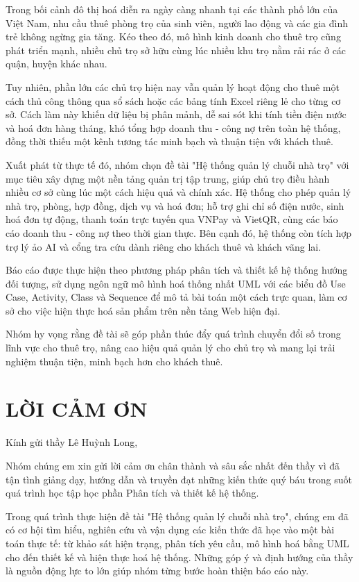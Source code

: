 \documentclass[a4paper,oneside]{report}
\newcommand{\chuongkhongso}[1]{%
  \chapter*{#1}%
  \addcontentsline{toc}{chapter}{#1}}
\begin{document}
Trong bối cảnh đô thị hoá diễn ra ngày càng nhanh tại các thành phố lớn
của Việt Nam, nhu cầu thuê phòng trọ của sinh viên, người lao động và
các gia đình trẻ không ngừng gia tăng. Kéo theo đó, mô hình kinh doanh
cho thuê trọ cũng phát triển mạnh, nhiều chủ trọ sở hữu cùng lúc nhiều
khu trọ nằm rải rác ở các quận, huyện khác nhau.

Tuy nhiên, phần lớn các chủ trọ hiện nay vẫn quản lý hoạt động cho thuê
một cách thủ công thông qua sổ sách hoặc các bảng tính Excel riêng lẻ
cho từng cơ sở. Cách làm này khiến dữ liệu bị phân mảnh, dễ sai sót khi
tính tiền điện nước và hoá đơn hàng tháng, khó tổng hợp doanh thu - công
nợ trên toàn hệ thống, đồng thời thiếu một kênh tương tác minh bạch và
thuận tiện với khách thuê.

Xuất phát từ thực tế đó, nhóm chọn đề tài "Hệ thống quản lý chuỗi nhà
trọ" với mục tiêu xây dựng một nền tảng quản trị tập trung, giúp chủ trọ
điều hành nhiều cơ sở cùng lúc một cách hiệu quả và chính xác. Hệ thống
cho phép quản lý nhà trọ, phòng, hợp đồng, dịch vụ và hoá đơn; hỗ trợ
ghi chỉ số điện nước, sinh hoá đơn tự động, thanh toán trực tuyến qua
VNPay và VietQR, cùng các báo cáo doanh thu - công nợ theo thời gian
thực. Bên cạnh đó, hệ thống còn tích hợp trợ lý ảo AI và cổng tra cứu
dành riêng cho khách thuê và khách vãng lai.

Báo cáo được thực hiện theo phương pháp phân tích và thiết kế hệ thống
hướng đối tượng, sử dụng ngôn ngữ mô hình hoá thống nhất UML với các
biểu đồ Use Case, Activity, Class và Sequence để mô tả bài toán một cách
trực quan, làm cơ sở cho việc hiện thực hoá sản phẩm trên nền tảng Web
hiện đại.

Nhóm hy vọng rằng đề tài sẽ góp phần thúc đẩy quá trình chuyển đổi số
trong lĩnh vực cho thuê trọ, nâng cao hiệu quả quản lý cho chủ trọ và
mang lại trải nghiệm thuận tiện, minh bạch hơn cho khách thuê.

\chuongkhongso{LỜI CẢM ƠN}

Kính gửi thầy Lê Huỳnh Long,

Nhóm chúng em xin gửi lời cảm ơn chân thành và sâu sắc nhất đến thầy vì
đã tận tình giảng dạy, hướng dẫn và truyền đạt những kiến thức quý báu
trong suốt quá trình học tập học phần Phân tích và thiết kế hệ thống.

Trong quá trình thực hiện đề tài "Hệ thống quản lý chuỗi nhà trọ", chúng
em đã có cơ hội tìm hiểu, nghiên cứu và vận dụng các kiến thức đã học
vào một bài toán thực tế: từ khảo sát hiện trạng, phân tích yêu cầu, mô
hình hoá bằng UML cho đến thiết kế và hiện thực hoá hệ thống. Những góp
ý và định hướng của thầy là nguồn động lực to lớn giúp nhóm từng bước
hoàn thiện báo cáo này.
\end{document}
